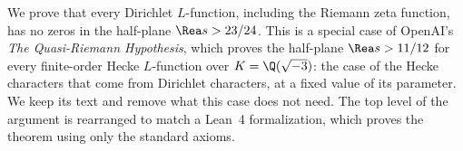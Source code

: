 We prove that every Dirichlet $L$-function, including the Riemann zeta function, has no zeros in the half-plane $\Rea s>23/24$. This is a special case of OpenAI's \emph{The Quasi-Riemann Hypothesis}, which proves the half-plane $\Rea s>11/12$ for every finite-order Hecke $L$-function over $K=\Q(\sqrt{-3})$: the case of the Hecke characters that come from Dirichlet characters, at a fixed value of its parameter. We keep its text and remove what this case does not need. The top level of the argument is rearranged to match a Lean~4 formalization, which proves the theorem using only the standard axioms.
